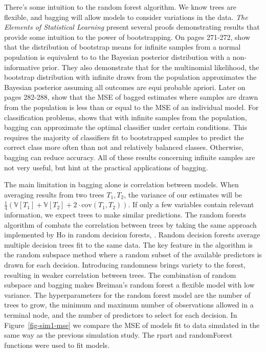 \documentclass[
  12pt,
  letterpaper,
  DIV=11,
  numbers=noendperiod]{scrartcl}
\begin{document}
There's some intuition to the random forest algorithm. We know trees are
flexible, and bagging will allow models to consider variations in the
data. \emph{The Elements of Statistical Learning} present several proofs
demonstrating results that provide some intuition to the power of
bootstrapping. On pages 271-272, \cite{esl} show that the distribution
of bootstrap means for infinite samples from a normal population is
equivalent to to the Bayesian posterior distribution with a
non-informative prior. They also demonstrate that for the multinomial
likelihood, the bootstrap distribution with infinite draws from the
population approximates the Bayesian posterior assuming all outcomes are
equi probable apriori. Later on pages 282-288, \cite{esl} show that the
MSE of bagged estimates where samples are drawn from the population is
less than or equal to the MSE of an individual model. For classification
problems, \cite{bagging} shows that with infinite samples from the
population, bagging can approximate the optimal classifier under certain
conditions. This requires the majority of classifiers fit to
bootstrapped samples to predict the correct class more often than not
and relatively balanced classes. Otherwise, bagging can reduce accuracy.
All of these results concerning infinite samples are not very useful,
but hint at the practical applications of bagging.

The main limitation in bagging alone is correlation between models. When
averaging results from two trees \(T_1,T_2\), the variance of our
estimates will be
\(\frac{1}{4}(\mathbb{V}[T_1]+\mathbb{V}[T_2]+2\cdot\text{cov}(T_1, T_2))\).
If only a few variables contain relevant information, we expect trees to
make similar predictions. The random forests algorithm of
\cite{random_forest} combats the correlation between trees by taking the
same approach implemented by Ho in random decision forests, \citep{Ho}.
Random decision forests average multiple decision trees fit to the same
data. The key feature in the algorithm is the random subspace method
where a random subset of the available predictors is drawn for each
decision. Introducing randomness brings variety to the forest, resulting
in weaker correlation between trees. The combination of random subspace
and bagging makes Breiman's random forest a flexible model with low
variance. The hyperparameters for the random forest model are the number
of trees to grow, the minimum and maximum number of observations allowed
in a terminal node, and the number of predictors to select for each
decision. In Figure~\ref{fig-sim1-mse} we compare the MSE of models fit
to data simulated in the same way as the previous simulation study. The
rpart \citep{rpart} and randomForest \citep{rf_r} functions were used to
fit models.
\end{document}
